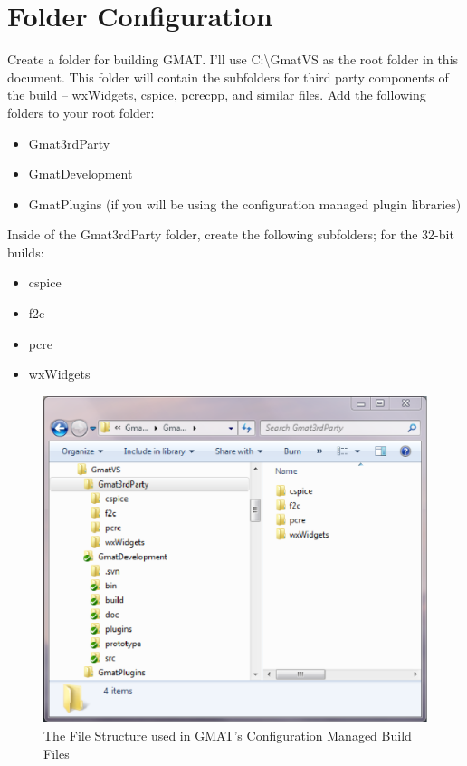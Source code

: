 \documentclass[letterpaper,10pt]{article}%
\begin{document}
\section{Folder Configuration}

Create a folder for building GMAT.  I'll use C:\textbackslash GmatVS as the root folder in this document.  This folder will contain the subfolders for third party components of the build -- wxWidgets, cspice, pcrecpp, and similar files.  Add the following folders to your root folder:
\begin{itemize}
\item Gmat3rdParty
\item GmatDevelopment
\item GmatPlugins (if you will be using the configuration managed plugin libraries)
\end{itemize}

\noindent Inside of the Gmat3rdParty folder, create the following subfolders; for the 32-bit builds:
\begin{itemize}
\item cspice
\item f2c
\item pcre
\item wxWidgets
\end{itemize}

\begin{figure}
\centering
\includegraphics[scale=0.75]{FolderStructure.eps}
\caption{The File Structure used in GMAT's Configuration Managed Build Files}
\label{fig:FolderStructure}
\end{figure}
\end{document}
